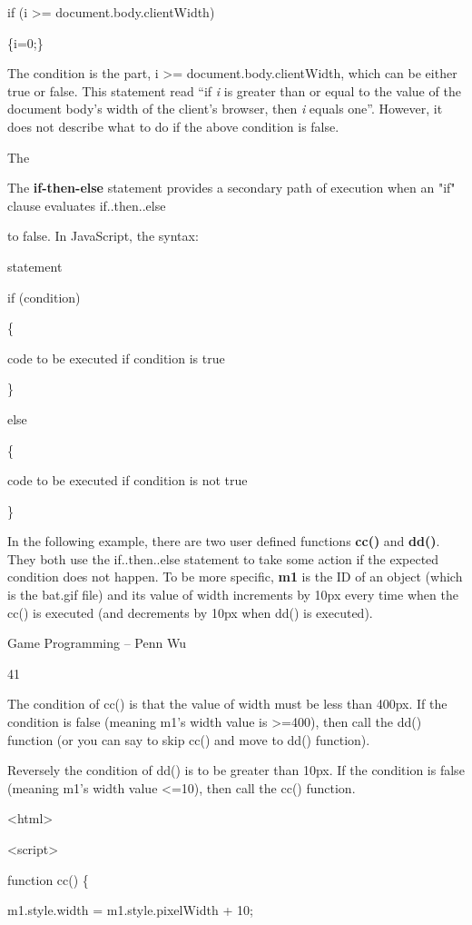 \documentclass[
]{article}
\begin{document}
if (i \textgreater= document.body.clientWidth)

\{i=0;\}

The condition is the part, i \textgreater= document.body.clientWidth,
which can be either true or false. This statement read ``if \emph{i} is
greater than or equal to the value of the document body's width of the
client's browser, then \emph{i} equals one''. However, it does not
describe what to do if the above condition is false.

The

The \textbf{if-then-else} statement provides a secondary path of
execution when an "if" clause evaluates if..then..else

to false. In JavaScript, the syntax:

statement

if (condition)

\{

code to be executed if condition is true

\}

else

\{

code to be executed if condition is not true

\}

In the following example, there are two user defined functions
\textbf{cc()} and \textbf{dd()}. They both use the if..then..else
statement to take some action if the expected condition does not happen.
To be more specific, \textbf{m1} is the ID of an object (which is the
bat.gif file) and its value of width increments by 10px every time when
the cc() is executed (and decrements by 10px when dd() is executed).

Game Programming -- Penn Wu

41

\protect\hypertarget{index_split_004.htmlux5cux23p42}{}{}The condition
of cc() is that the value of width must be less than 400px. If the
condition is false (meaning m1's width value is \textgreater=400), then
call the dd() function (or you can say to skip cc() and move to dd()
function).

Reversely the condition of dd() is to be greater than 10px. If the
condition is false (meaning m1's width value \textless=10), then call
the cc() function.

\textless html\textgreater{}

\textless script\textgreater{}

function cc() \{

m1.style.width = m1.style.pixelWidth + 10;
\end{document}
